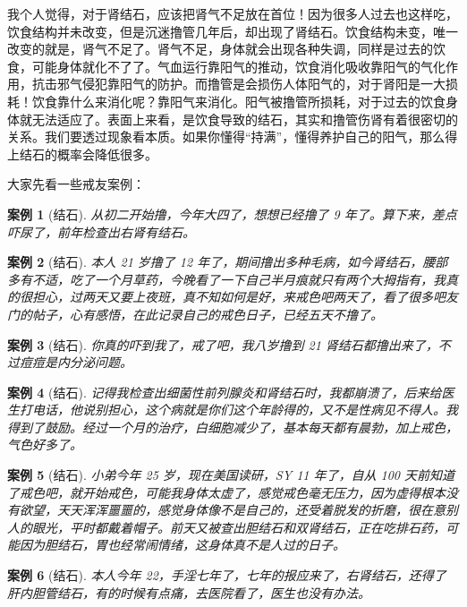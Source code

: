 \documentclass{ctexart}
\newtheorem{case}{案例}
\begin{document}
我个人觉得，对于肾结石，应该把肾气不足放在首位！因为很多人过去也这样吃，饮食结构并未改变，但是沉迷撸管几年后，却出现了肾结石。饮食结构未变，唯一改变的就是，肾气不足了。肾气不足，身体就会出现各种失调，同样是过去的饮食，可能身体就化不了了。气血运行靠阳气的推动，饮食消化吸收靠阳气的气化作用，抗击邪气侵犯靠阳气的防护。而撸管是会损伤人体阳气的，对于肾阳是一大损耗！饮食靠什么来消化呢？靠阳气来消化。阳气被撸管所损耗，对于过去的饮食身体就无法适应了。表面上来看，是饮食导致的结石，其实和撸管伤肾有着很密切的关系。我们要透过现象看本质。如果你懂得“持满”，懂得养护自己的阳气，那么得上结石的概率会降低很多。

大家先看一些戒友案例：

\begin{case}[结石]\it
    从初二开始撸，今年大四了，想想已经撸了 9 年了。算下来，差点吓尿了，前年检查出右肾有结石。
\end{case}

\begin{case}[结石]\it
    本人 21 岁撸了 12 年了，期间撸出多种毛病，如今肾结石，腰部多有不适，吃了一个月草药，今晚看了一下自己半月痕就只有两个大拇指有，我真的很担心，过两天又要上夜班，真不知如何是好，来戒色吧两天了，看了很多吧友门的帖子，心有感悟，在此记录自己的戒色日子，已经五天不撸了。
\end{case}

\begin{case}[结石]\it
    你真的吓到我了，戒了吧，我八岁撸到 21 肾结石都撸出来了，不过痘痘是内分泌问题。
\end{case}

\begin{case}[结石]\it
    记得我检查出细菌性前列腺炎和肾结石时，我都崩溃了，后来给医生打电话，他说别担心，这个病就是你们这个年龄得的，又不是性病见不得人。我得到了鼓励。经过一个月的治疗，白细胞减少了，基本每天都有晨勃，加上戒色，气色好多了。
\end{case}

\begin{case}[结石]\it
    小弟今年 25 岁，现在美国读研，SY 11 年了，自从 100 天前知道了戒色吧，就开始戒色，可能我身体太虚了，感觉戒色毫无压力，因为虚得根本没有欲望，天天浑浑噩噩的，感觉身体像不是自己的，还受着脱发的折磨，很在意别人的眼光，平时都戴着帽子。前天又被查出胆结石和双肾结石，正在吃排石药，可能因为胆结石，胃也经常闹情绪，这身体真不是人过的日子。
\end{case}

\begin{case}[结石]\it
    本人今年 22，手淫七年了，七年的报应来了，右肾结石，还得了肝内胆管结石，有的时候有点痛，去医院看了，医生也没有办法。
\end{case}
\end{document}
